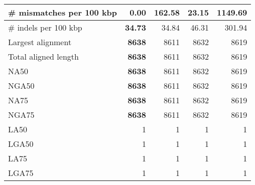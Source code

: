 \documentclass[12pt,a4paper]{article}
\begin{document}
\begin{table}[ht]
\begin{center}
\begin{tabular}{|l*{4}{|r}|}
\# mismatches per 100 kbp & {\bf 0.00} & 162.58 & 23.15 & 1149.69 \\ \hline
\# indels per 100 kbp & {\bf 34.73} & 34.84 & 46.31 & 301.94 \\ \hline
Largest alignment & {\bf 8638} & 8611 & 8632 & 8619 \\ \hline
Total aligned length & {\bf 8638} & 8611 & 8632 & 8619 \\ \hline
NA50 & {\bf 8638} & 8611 & 8632 & 8619 \\ \hline
NGA50 & {\bf 8638} & 8611 & 8632 & 8619 \\ \hline
NA75 & {\bf 8638} & 8611 & 8632 & 8619 \\ \hline
NGA75 & {\bf 8638} & 8611 & 8632 & 8619 \\ \hline
LA50 & 1 & 1 & 1 & 1 \\ \hline
LGA50 & 1 & 1 & 1 & 1 \\ \hline
LA75 & 1 & 1 & 1 & 1 \\ \hline
LGA75 & 1 & 1 & 1 & 1 \\ \hline
\end{tabular}
\end{center}
\end{table}
\end{document}
